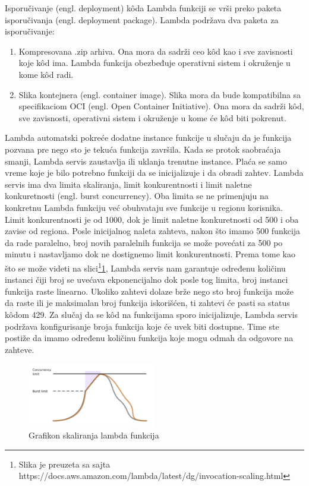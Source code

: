 \documentclass[12pt,oneside]{memoir}
\begin{document}
Isporučivanje (engl. deployment) kôda Lambda funkciji se vrši preko paketa isporučivanja (engl. deployment package). Lambda podržava dva paketa za isporučivanje:
\begin{enumerate}
  \item Kompresovana .zip arhiva. Ona mora da sadrži ceo kôd kao i sve zavisnosti koje kôd ima. Lambda funkcija obezbeđuje operativni sistem i okruženje u kome kôd radi.
  \item Slika kontejnera (engl. container image). Slika mora da bude kompatibilna sa specifikaciom OCI (engl. Open Container Initiative). Ona mora da sadrži kôd, sve zavisnosti, operativni sistem i okruženje u kome će kôd biti pokrenut.
\end{enumerate}
 
Lambda automatski pokreće dodatne instance funkcije u slučaju da je funkcija pozvana pre nego sto je tekuća funkcija završila. Kada se protok saobraćaja smanji, Lambda servis zaustavlja ili uklanja trenutne instance. Plaća se samo vreme koje je bilo potrebno funkciji da se inicijalizuje i da obradi zahtev. Lambda servis ima dva limita skaliranja, limit konkurentnosti i limit naletne konkuretnosti (engl. burst concurrency). Oba limita se ne primenjuju na konkretnu Lambda funkciju već obuhvataju sve funkcije u regionu korisnika. Limit konkurentnosti je od 1000, dok je limit naletne konkuretnosti od 500 i oba zavise od regiona. Posle inicijalnog naleta zahteva, nakon što imamo 500 funkcija da rade paralelno, broj novih paralelnih funkcija se može povećati za 500 po minutu i nastavljamo dok ne dostignemo limit konkurentnosti. Prema tome kao što se može videti na slici\footnote{Slika je preuzeta sa sajta https://docs.aws.amazon.com/lambda/latest/dg/invocation-scaling.html}\ref{fig:awsLambdaSkaliranje}, Lambda servis nam garantuje određenu količinu instanci čiji broj se uvećava ekponencijalno dok posle tog limita, broj instanci funkcija raste linearno. Ukoliko zahtevi dolaze brže nego sto broj funkcija može da raste ili je maksimalan broj funkcija iskorišćen, ti zahtevi će pasti sa status kôdom 429. Za slučaj da se kôd na funkcijama sporo inicijalizuje, Lambda servis podržava konfigurisanje broja funkcija koje će uvek biti dostupne. Time ste postiže da imamo određenu količinu funkcija koje mogu odmah da odgovore na zahteve.
 

\begin{figure}[!ht]
  \centering
  \includegraphics[width=0.5\textwidth]{AWS-Lambda-skaliranje.png}
  \caption{Grafikon skaliranja lambda funkcija}
  \label{fig:awsLambdaSkaliranje}
\end{figure}
 
\end{document}
